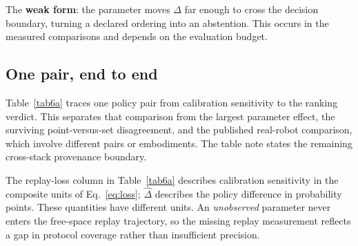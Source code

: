 \documentclass[pdflatex,iicol,sn-apa]{sn-jnl}
\theoremstyle{remark}
\begin{document}
The \textbf{weak form}: the parameter moves $\Delta$ far enough to cross the decision boundary,
turning a declared ordering into an abstention. This occurs in the measured comparisons and depends on the evaluation budget.

\subsection{One pair, end to end}\label{subsec7_1b}

Table~\ref{tab6a} traces one policy pair from calibration sensitivity to the ranking verdict.
This separates that comparison from the largest parameter effect, the surviving point-versus-set
disagreement, and the published real-robot comparison, which involve different pairs or embodiments.
The table note states the remaining cross-stack provenance boundary.

The replay-loss column in Table~\ref{tab6a} describes calibration sensitivity in the composite units of Eq.~\eqref{eq:loss}; $\hat\Delta$ describes the policy difference in probability points. These quantities have different units. An \emph{unobserved} parameter never enters the free-space replay trajectory, so the missing replay measurement reflects a gap in protocol coverage rather than insufficient precision.
\end{document}
